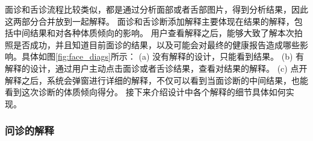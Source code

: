 面诊和舌诊流程比较类似，都是通过分析面部或者舌部图片，得到分析结果，因此这两部分合并放到一起解释。
面诊和舌诊断添加解释主要体现在结果的解释，包括中间结果和对各种体质倾向的影响。
用户查看解释之后，能够大致了解本次拍照是否成功，并且知道目前面诊的结果，以及可能会对最终的健康报告造成哪些影响。具体如图\ref{fig:face_diags}所示：
(a) 没有解释的设计，只能看到结果。
(b) 有解释的设计，通过用户主动点击面诊或者舌诊结果，查看对结果的解释。
(c) 点开解释之后，系统会弹窗进行详细的解释，不仅可以看到当面诊断的中间结果，也能看到这次诊断的体质倾向得分。
接下来介绍设计中各个解释的细节具体如何实现。


\subsubsection{问诊的解释}

\begin{figure}[htbp]
    \centering

\end{figure}
